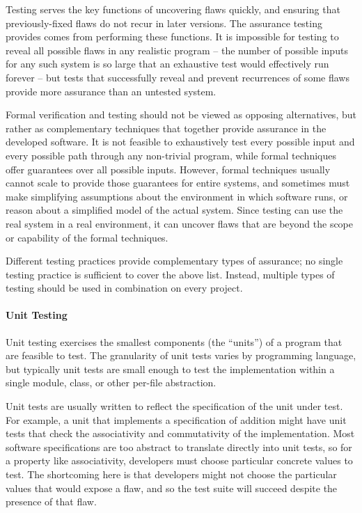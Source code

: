 Testing serves the key functions of uncovering flaws quickly, and
ensuring that previously-fixed flaws do not recur in later
versions. The assurance testing provides comes from performing these
functions. It is impossible for testing to reveal all possible flaws
in any realistic program -- the number of possible inputs for any such
system is so large that an exhaustive test would effectively run
forever -- but tests that successfully reveal and prevent recurrences
of some flaws provide more assurance than an untested system.

Formal verification and testing should not be viewed as opposing
alternatives, but rather as complementary techniques that together
provide assurance in the developed software. It is not feasible to
exhaustively test every possible input and every possible path through
any non-trivial program, while formal techniques offer guarantees over
all possible inputs. However, formal techniques usually cannot scale
to provide those guarantees for entire systems, and sometimes must
make simplifying assumptions about the environment in which software
runs, or reason about a simplified model of the actual system. Since
testing can use the real system in a real environment, it can uncover
flaws that are beyond the scope or capability of the formal
techniques.

Different testing practices provide complementary types of assurance;
no single testing practice is sufficient to cover the above
list. Instead, multiple types of testing should be used in
combination on every project.

\paragraph{Unit Testing}

Unit testing exercises the smallest components (the ``units'') of a
program that are feasible to test. The granularity of unit tests
varies by programming language, but typically unit tests are small
enough to test the implementation within a single module, class, or
other per-file abstraction.

Unit tests are usually written to reflect the specification of the
unit under test. For example, a unit that implements a specification
of addition might have unit tests that check the associativity and
commutativity of the implementation. Most software specifications are
too abstract to translate directly into unit tests, so for a property
like associativity, developers must choose particular concrete values
to test. The shortcoming here is that developers might not choose the
particular values that would expose a flaw, and so the test suite
will succeed despite the presence of that flaw.

